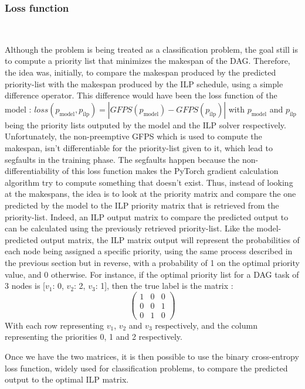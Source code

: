 \subsubsection{Loss function}
~
\label{sec:loss_design}

Although the problem is being treated as a classification problem,
the goal still is to compute a priority list that minimizes the makespan
of the DAG.
Therefore, the idea was, initially, to compare the makespan
produced by the predicted priority-list with the makespan
produced by the ILP schedule, using a simple difference operator.
This difference would have been the loss function of the model : 
$loss(p_{\text{model}}, p_{\text{ilp}}) = |GFPS(p_{\text{model}}) - GFPS(p_{\text{ilp}})|$
with $p_{\text{model}}$ and $p_{\text{ilp}}$ being 
the priority lists outputed by the model and the ILP solver respectively.
Unfortunately, the non-preemptive GFPS which is used to compute the makespan,
isn't differentiable for the priority-list given to it,
which lead to segfaults in the training phase.
The segfaults happen because the non-differentiability 
of this loss function makes the PyTorch gradient calculation algorithm
try to compute something that doesn't exist.
Thus, instead of looking at the makespans,
the idea is to look at the priority matrix 
and compare the one predicted by the model to
the ILP priority matrix that is retrieved from the priority-list.
Indeed, an ILP output matrix to compare the predicted output to
can be calculated using the previously retrieved priority-list.
Like the model-predicted output matrix,
the ILP matrix output will represent the probabilities
of each node being assigned a specific priority, using the 
same process described in the previous section but in reverse, with a probability of 1 
on the optimal priority value, and 0 otherwise. 
For instance, if the optimal priority list for a DAG task of 3 nodes 
is [$v_1$: 0, $v_2$: 2, $v_3$: 1],
then the true label is the matrix :
$$
\begin{pmatrix}
    1 & 0 & 0\\
    0 & 0 & 1\\
    0 & 1 & 0
\end{pmatrix}
$$
With each row representing $v_1$, $v_2$ and $v_3$ respectively,
and the column representing the priorities 0, 1 and 2 respectively.

Once we have the two matrices, 
it is then possible to use the binary cross-entropy loss function,
widely used for classification problems,
to compare the predicted output to the optimal ILP matrix.

